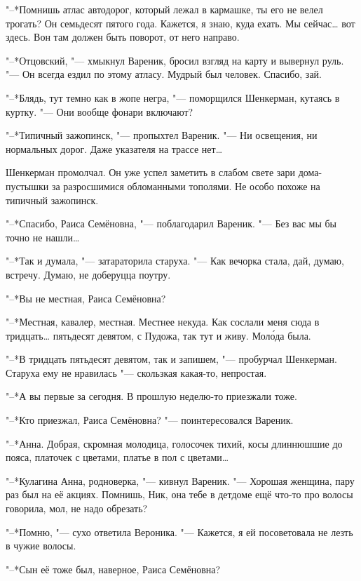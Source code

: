 "--*Помнишь атлас автодорог, который лежал в кармашке, ты его не велел трогать?
Он семьдесят пятого года.
Кажется, я знаю, куда ехать.
Мы сейчас\ldots{} вот здесь.
Вон там должен быть поворот, от него направо.

"--*Отцовский, "--- хмыкнул Вареник, бросил взгляд на карту и вывернул руль.
"--- Он всегда ездил по этому атласу.
Мудрый был человек.
Спасибо, зай.

"--*Блядь, тут темно как в жопе негра, "--- поморщился Шенкерман, кутаясь в куртку.
"--- Они вообще фонари включают?

"--*Типичный зажопинск, "--- пропыхтел Вареник.
"--- Ни освещения, ни нормальных дорог.
Даже указателя на трассе нет\ldots{}

Шенкерман промолчал.
Он уже успел заметить в слабом свете зари дома-пустышки за разросшимися обломанными тополями.
Не особо похоже на типичный зажопинск.

\asterism

\textspace

"--*Спасибо, Раиса Семёновна, "--- поблагодарил Вареник.
"--- Без вас мы бы точно не нашли\ldots{}

"--*Так и думала, "--- затараторила старуха.
"--- Как вечорка стала, дай, думаю, встречу.
Думаю, не доберуцца поутру.

"--*Вы не местная, Раиса Семёновна?

"--*Местная, кавалер, местная.
Местнее некуда.
Как сослали меня сюда в тридцать\ldots{} пятьдесят девятом, с Пудожа, так тут и живу.
Мол\'ода была.

"--*В тридцать пятьдесят девятом, так и запишем, "--- пробурчал Шенкерман.
Старуха ему не нравилась "--- скользкая какая-то, непростая.

"--*А вы первые за сегодня.
В прошлую неделю-то приезжали тоже.

"--*Кто приезжал, Раиса Семёновна? "--- поинтересовался Вареник.

"--*Анна.
Добрая, скромная молодица, голосочек тихий, косы длиннюшшие до пояса, платочек с цветами, платье в пол с цветами\ldots{}

"--*Кулагина Анна, родноверка, "--- кивнул Вареник.
"--- Хорошая женщина, пару раз был на её акциях.
Помнишь, Ник, она тебе в детдоме ещё что-то про волосы говорила, мол, не надо обрезать?

"--*Помню, "--- сухо ответила Вероника.
"--- Кажется, я ей посоветовала не лезть в чужие волосы.

"--*Сын её тоже был, наверное, Раиса Семёновна?

